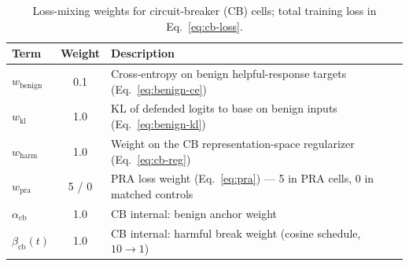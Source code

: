 \begin{table}[t]
  \centering
  \small
  \caption{Loss-mixing weights for circuit-breaker (CB) cells; total
    training loss in Eq.~\eqref{eq:cb-loss}.}
  \label{tab:cb-loss}
  \begin{tabular}{@{}l c l@{}}
    \toprule
    Term & Weight & Description \\
    \midrule
    \(w_\text{benign}\)    & 0.1   & Cross-entropy on benign helpful-response targets (Eq.~\ref{eq:benign-ce}) \\
    \(w_\text{kl}\)        & 1.0   & KL of defended logits to base on benign inputs (Eq.~\ref{eq:benign-kl}) \\
    \(w_\text{harm}\)      & 1.0   & Weight on the CB representation-space regularizer (Eq.~\ref{eq:cb-reg}) \\
    \(w_\text{pra}\)       & 5 / 0 & PRA loss weight (Eq.~\ref{eq:pra}) --- 5 in PRA cells, 0 in matched controls \\
    \(\alpha_\text{cb}\)   & 1.0   & CB internal: benign anchor weight \\
    \(\beta_\text{cb}(t)\) & 1.0   & CB internal: harmful break weight (cosine schedule, \(10\!\to\!1\)) \\
    \bottomrule
  \end{tabular}
\end{table}


